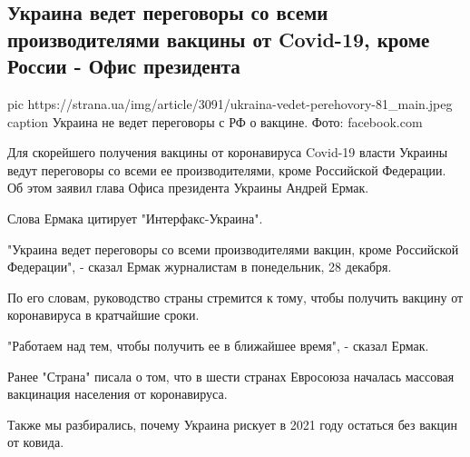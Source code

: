  
 
 
 
 
 
\subsection{Украина ведет переговоры со всеми производителями вакцины от Covid-19, кроме России - Офис президента}
\label{sec:27_12_2020.news.ua.strana.1.ukraina_covid_vaccine_russia}

\ifcmt
pic https://strana.ua/img/article/3091/ukraina-vedet-perehovory-81_main.jpeg
caption Украина не ведет переговоры с РФ о вакцине. Фото: facebook.com
\fi

Для скорейшего получения вакцины от коронавируса Covid-19 власти Украины ведут
переговоры со всеми ее производителями, кроме Российской Федерации. Об этом
заявил глава Офиса президента Украины Андрей Ермак.

Слова Ермака цитирует "Интерфакс-Украина".

"Украина ведет переговоры со всеми производителями вакцин, кроме Российской
Федерации", - сказал Ермак журналистам в понедельник, 28 декабря.

По его словам, руководство страны стремится к тому, чтобы получить вакцину от
коронавируса в кратчайшие сроки.

"Работаем над тем, чтобы получить ее в ближайшее время", - сказал Ермак.

Ранее "Страна" писала о том, что в шести странах Евросоюза началась массовая
вакцинация населения от коронавируса.

Также мы разбирались, почему Украина рискует в 2021 году остаться без вакцин от
ковида.

